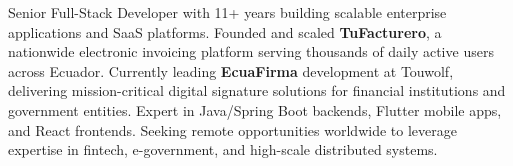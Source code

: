 
\begin{cvparagraph}

Senior Full-Stack Developer with 11+ years building scalable enterprise applications and SaaS platforms. Founded and scaled \textbf{TuFacturero}, a nationwide electronic invoicing platform serving thousands of daily active users across Ecuador. Currently leading \textbf{EcuaFirma} development at Touwolf, delivering mission-critical digital signature solutions for financial institutions and government entities. Expert in Java/Spring Boot backends, Flutter mobile apps, and React frontends. Seeking remote opportunities worldwide to leverage expertise in fintech, e-government, and high-scale distributed systems.
\end{cvparagraph}

